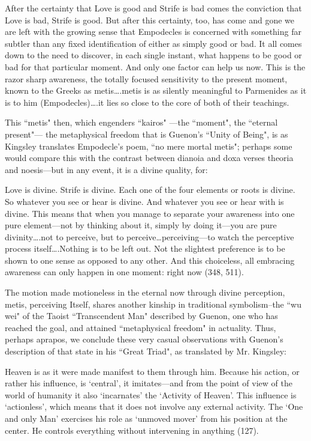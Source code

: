 \begin{quotex}
After the certainty that Love is good and Strife is bad comes the conviction that Love is bad, Strife is good. But after this certainty, too, has come and gone we are left with the growing sense that Empodecles is concerned with something far subtler than any fixed identification of either as simply good or bad. It all comes down to the need to discover, in each single instant, what happens to be good or bad for that particular moment. And only one factor can help us now. This is the razor sharp awareness, the totally focused sensitivity to the present moment, known to the Greeks as metis….metis is as silently meaningful to Parmenides as it is to him (Empodecles)….it lies so close to the core of both of their teachings. 

\end{quotex}
This ``metis" then, which engenders ``kairos" —the ``moment", the ``eternal present"— the metaphysical freedom that is Guenon's ``Unity of Being", is as Kingsley translates Empodecle's poem, ``no mere mortal metis"; perhaps some would compare this with the contrast between dianoia and doxa verses theoria and noesis—but in any event, it is a divine quality, for:

\begin{quotex}
Love is divine. Strife is divine. Each one of the four elements or roots is divine. So whatever you see or hear is divine. And whatever you see or hear with is divine. This means that when you manage to separate your awareness into one pure element—not by thinking about it, simply by doing it—you are pure divinity….not to perceive, but to perceive…perceiving—to watch the perceptive process itself….Nothing is to be left out. Not the slightest preference is to be shown to one sense as opposed to any other. And this choiceless, all embracing awareness can only happen in one moment: right now (348, 511).

\end{quotex}
The motion made motioneless in the eternal now through divine perception, metis, perceiving Itself, shares another kinship in traditional symbolism–the ``wu wei" of the Taoist ``Transcendent Man" described by Guenon, one who has reached the goal, and attained ``metaphysical freedom" in actuality. Thus, perhaps aprapos, we conclude these very casual observations with Guenon's description of that state in his ``Great Triad", as translated by Mr. Kingsley:

\begin{quotex}
Heaven is as it were made manifest to them through him. Because his action, or rather his influence, is `central', it imitates—and from the point of view of the world of humanity it also `incarnates' the `Activity of Heaven'. This influence is `actionless', which means that it does not involve any external activity. The `One and only Man' exercises his role as `unmoved mover' from his position at the center. He controls everything without intervening in anything (127).

\end{quotex}


